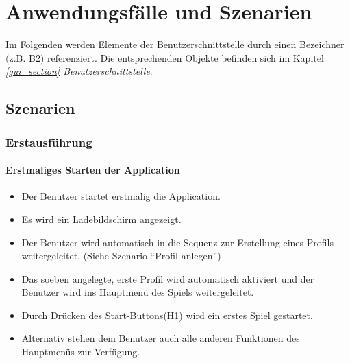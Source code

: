\section{Anwendungsfälle und Szenarien}

Im Folgenden werden Elemente der Benutzerschnittstelle durch einen Bezeichner $($z.B. B2$)$ referenziert. Die entsprechenden Objekte befinden sich im Kapitel \textit{\ref{gui_section} Benutzerschnittstelle}.

\subsection{Szenarien}

\subsubsection{Erstausführung}
\paragraph{Erstmaliges Starten der Application}
\begin{itemize}
	\item Der Benutzer startet erstmalig die Application.
	\item Es wird ein Ladebildschirm angezeigt.
	\item Der Benutzer wird automatisch in die Sequenz zur Erstellung eines Profils weitergeleitet. (Siehe Szenario "`Profil anlegen"')
	\item Das soeben angelegte, erste Profil wird automatisch aktiviert und der Benutzer wird ins Hauptmenü des Spiels weitergeleitet.
	\item Durch Drücken des Start-Buttons(H1) wird ein erstes Spiel gestartet.
	\item Alternativ stehen dem Benutzer auch alle anderen Funktionen des Hauptmenüs zur Verfügung.
\end{itemize}
